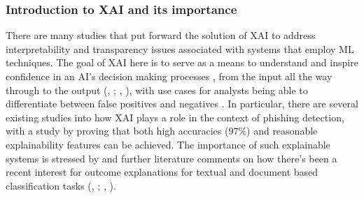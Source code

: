 
\subsubsection*{Introduction to XAI and its importance}
There are many studies that put forward the solution of XAI to address interpretability and transparency issues \citep{roshan2022using} associated with systems that employ ML techniques. The goal of XAI here is to serve as a means to understand and inspire confidence in an AI's decision making processes \citep{khanom2025pd_ebm}, from the input all the way through to the output (\citeauthor{jawale2020jeevn}, \citeyear{jawale2020jeevn}; \citeauthor{sanchez2022phishing}, \citeyear{sanchez2022phishing}), with use cases for analysts being able to differentiate between false positives and negatives \citep{van2024applicability}. In particular, there are several existing studies into how XAI plays a role in the context of phishing detection, with a study by \cite{alzahrani2024explainable} proving that both high accuracies (97\%) and reasonable explainability features can be achieved. The importance of such explainable systems is stressed by \cite{shendkar2024enhancing} and further literature comments on how there's been a recent interest for outcome explanations for textual and document based classification tasks (\citeauthor{martens2014explaining}, \citeyear{martens2014explaining}; \citeauthor{lei2016rationalizing}, \citeyear{lei2016rationalizing}).
